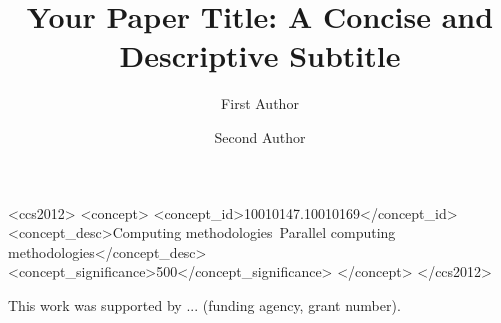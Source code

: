 \documentclass[sigplan,10pt,anonymous]{acmart}
\begin{document}
\title{Your Paper Title: A Concise and Descriptive Subtitle}

\author{First Author}

\author{Second Author}

\begin{abstract}

\end{abstract}

\begin{CCSXML}
<ccs2012>
   <concept>
       <concept_id>10010147.10010169</concept_id>
       <concept_desc>Computing methodologies~Parallel computing methodologies</concept_desc>
       <concept_significance>500</concept_significance>
   </concept>
</ccs2012>
\end{CCSXML}


\maketitle








\begin{acks}
This work was supported by ... (funding agency, grant number).
\end{acks}



\end{document}
